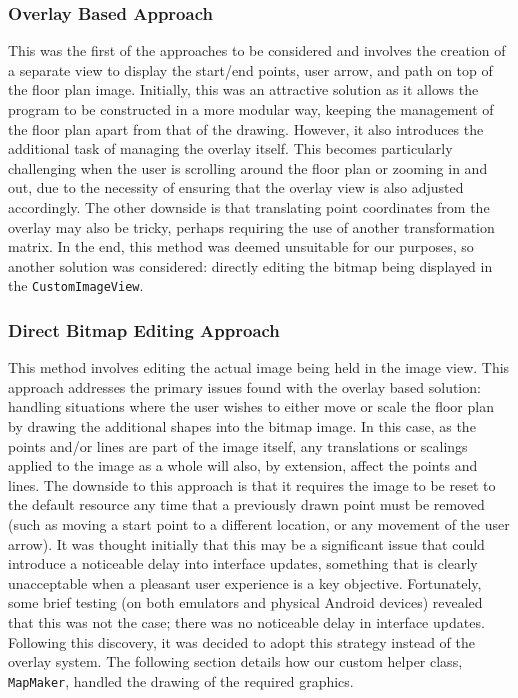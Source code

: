\documentclass[12pt,a4paper]{report}
\begin{document}
                \subsubsection{Overlay Based Approach}
                    This was the first of the approaches to be considered and involves the creation of a separate view to display the start/end points, user arrow, and path on top
                    of the floor plan image. Initially, this was an attractive solution as it allows the program to be constructed in a more modular way, keeping the management of the
                    floor plan apart from that of the drawing. However, it also introduces the additional task of managing the overlay itself. This becomes particularly challenging
                    when the user is scrolling around the floor plan or zooming in and out, due to the necessity of ensuring that the overlay view is also adjusted accordingly.
                    The other downside is that translating point coordinates from the overlay may also be tricky, perhaps requiring the use of another transformation matrix.
                    In the end, this method was deemed unsuitable for our purposes, so another solution was considered: directly editing the bitmap being displayed in the
                    \texttt{CustomImageView}.
                \subsubsection{Direct Bitmap Editing Approach}
                    This method involves editing the actual image being held in the image view. This approach addresses the primary issues found with the overlay based solution:
                    handling situations where the user wishes to either move or scale the floor plan by drawing the additional shapes into the bitmap image.
                     In this case, as the points and/or lines are part of the image itself, any translations
                    or scalings applied to the image as a whole will also, by extension, affect the points and lines. The downside to this approach is that it requires the image to be reset
                    to the default resource any time that a previously drawn point must be removed (such as moving a start point to a different location, or any movement of the
                    user arrow). It was thought initially that this may be a significant issue that could introduce a noticeable delay into interface updates, something that is clearly
                    unacceptable when a pleasant user experience is a key objective. Fortunately, some brief testing (on both emulators and physical Android devices)
                    revealed that this was not the case; there was no noticeable delay in interface updates. Following this discovery, it was decided to adopt this strategy instead of the
                    overlay system. The following section details how our custom helper class, \texttt{MapMaker}, handled the drawing of the required graphics.
\end{document}
